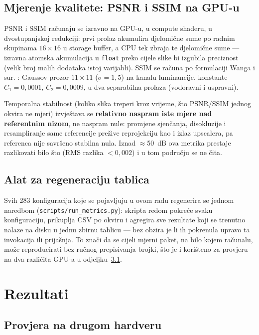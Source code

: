 \documentclass{mathos}
\begin{document}
\section{Mjerenje kvalitete: PSNR i SSIM na GPU-u}

PSNR i SSIM računaju se izravno na GPU-u, u compute shaderu, u dvostupanjskoj
redukciji: prvi prolaz akumulira djelomične sume po radnim skupinama
$16\times16$ u storage buffer, a CPU tek zbraja te djelomične sume — izravna
atomska akumulacija u \verb+float+ preko cijele slike bi izgubila
preciznost (velik broj malih dodataka istoj varijabli). SSIM se računa po
formulaciji Wanga i sur. \cite{WangSSIM}: Gaussov prozor $11\times11$
($\sigma=1,5$) na kanalu luminancije, konstante $C_1=0,0001$,
$C_2=0,0009$, u dva separabilna prolaza (vodoravni i uspravni).

Temporalna stabilnost (koliko slika treperi kroz vrijeme, što PSNR/SSIM
jednog okvira ne mjeri) izvještava se \textbf{relativno naspram iste mjere
nad referentnim nizom}, ne naspram nule: promjene sjenčanja, disokluzije i
resampliranje same referencije prežive reprojekciju kao i izlaz upscalera,
pa referenca nije savršeno stabilna nula. Iznad $\approx$50~dB ova metrika
prestaje razlikovati bilo što ($\text{RMS}$ razlika $<0,002$) i u tom
području se ne čita.

\section{Alat za regeneraciju tablica}

Svih 283 konfiguracija koje se pojavljuju u ovom radu regenerira se jednom
naredbom (\verb+scripts/run_metrics.py+): skripta redom pokreće svaku
konfiguraciju, prikuplja CSV po okviru i agregira sve rezultate koji se
trenutno nalaze na disku u jednu zbirnu tablicu — bez obzira je li ih
pokrenula upravo ta invokacija ili prijašnja. To znači da se cijeli mjerni
paket, na bilo kojem računalu, može reproducirati bez ručnog prepisivanja
brojki, što je i korišteno za provjeru na dva različita GPU-a u
odjeljku~\ref{ProvjeraHardver}.


\chapter{Rezultati}\label{Rezultati}

\section{Provjera na drugom hardveru}\label{ProvjeraHardver}
\end{document}
